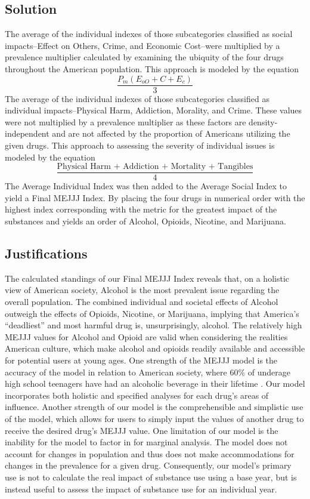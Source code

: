 \documentclass{article}
\begin{document}
\subsection{Solution}
    The average of the individual indexes of those subcategories classified as social impacts--Effect on Others, Crime, and Economic Cost--were multiplied by a prevalence multiplier calculated by examining the ubiquity of the four drugs throughout the American population. This approach is modeled by the equation 
    $$\frac{P_m(E_{oO} + C + E_{c})}{3}$$
    The average of the individual indexes of those subcategories classified as individual impacts--Physical Harm, Addiction, Morality, and Crime. These values were not multiplied by a prevalence multiplier as these factors are density-independent and are not affected by the proportion of Americans utilizing the given drugs. This approach to assessing the severity of individual issues is modeled by the equation 
    $$\dfrac{\text{Physical Harm + Addiction + Mortality + Tangibles}}{4}$$ 
    The Average Individual Index was then added to the Average Social Index to yield a Final MEJJJ Index. By placing the four drugs in numerical order with the highest index corresponding with the metric for the greatest impact of the substances and yields an order of Alcohol, Opioids, Nicotine, and Marijuana.

\subsection{Justifications}
    The calculated standings of our Final MEJJJ Index reveals that, on a holistic view of American society, Alcohol is the most prevalent issue regarding the overall population. The combined individual and societal effects of Alcohol outweigh the effects of Opioids, Nicotine, or Marijuana, implying that America’s “deadliest” and most harmful drug is, unsurprisingly, alcohol. The relatively high MEJJJ values for Alcohol and Opioid are valid when considering the realities American culture, which make alcohol and opioids readily available and accessible for potential users at young ages. One strength of the MEJJJ model is the accuracy of the model in relation to American society, where 60\% of underage high school teenagers have had an alcoholic beverage in their lifetime \cite {pubs}. Our model incorporates both holistic and specified analyses for each drug’s areas of influence. Another strength of our model is the comprehensible and simplistic use of the model, which allows for users to simply input the values of another drug to receive the desired drug’s MEJJJ value. One limitation of our model is the inability for the model to factor in for marginal analysis. The model does not account for changes in population and thus does not make accommodations for changes in the prevalence for a given drug. Consequently, our model’s primary use is not to calculate the real impact of substance use using a base year, but is instead useful to assess the impact of substance use for an individual year.
\end{document}
